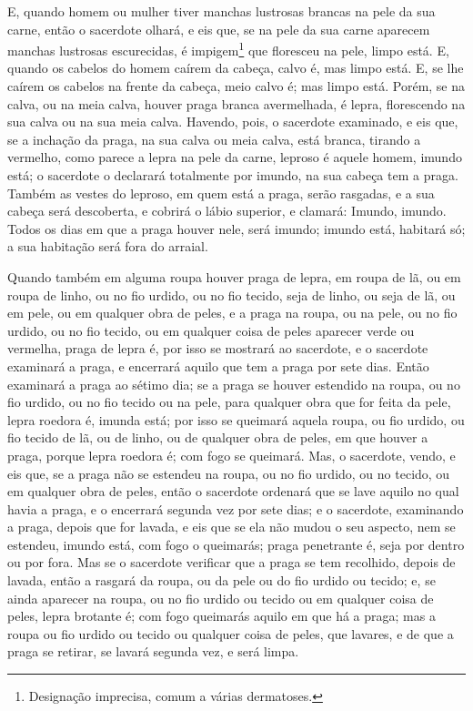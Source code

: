 E, quando homem ou mulher tiver manchas lustrosas brancas na pele
da sua carne, então o sacerdote olhará, e eis que, se na pele
da sua carne aparecem manchas lustrosas escurecidas, é
impigem\footnote{Designação imprecisa, comum a várias dermatoses.}
que floresceu na pele, limpo está. E, quando os cabelos do
homem caírem da cabeça, calvo é, mas limpo está. E, se lhe
caírem os cabelos na frente da cabeça, meio calvo é; mas limpo está.
Porém, se na calva, ou na meia calva, houver praga branca
avermelhada, é lepra, florescendo na sua calva ou na sua meia calva.
Havendo, pois, o sacerdote examinado, e eis que, se a
inchação da praga, na sua calva ou meia calva, está branca, tirando
a vermelho, como parece a lepra na pele da carne, leproso é
aquele homem, imundo está; o sacerdote o declarará totalmente por
imundo, na sua cabeça tem a praga. Também as vestes do
leproso, em quem está a praga, serão rasgadas, e a sua cabeça será
descoberta, e cobrirá o lábio superior, e clamará: Imundo, imundo.
Todos os dias em que a praga houver nele, será imundo; imundo
está, habitará só; a sua habitação será fora do arraial.

Quando também em alguma roupa houver praga de lepra, em roupa de
lã, ou em roupa de linho, ou no fio urdido, ou no fio tecido,
seja de linho, ou seja de lã, ou em pele, ou em qualquer obra de
peles, e a praga na roupa, ou na pele, ou no fio urdido, ou
no fio tecido, ou em qualquer coisa de peles aparecer verde ou
vermelha, praga de lepra é, por isso se mostrará ao sacerdote,
e o sacerdote examinará a praga, e encerrará aquilo que tem a
praga por sete dias. Então examinará a praga ao sétimo dia;
se a praga se houver estendido na roupa, ou no fio urdido, ou no fio
tecido ou na pele, para qualquer obra que for feita da pele, lepra
roedora é, imunda está; por isso se queimará aquela roupa, ou
fio urdido, ou fio tecido de lã, ou de linho, ou de qualquer obra de
peles, em que houver a praga, porque lepra roedora é; com fogo se
queimará. Mas, o sacerdote, vendo, e eis que, se a praga não
se estendeu na roupa, ou no fio urdido, ou no tecido, ou em qualquer
obra de peles, então o sacerdote ordenará que se lave aquilo
no qual havia a praga, e o encerrará segunda vez por sete dias;
e o sacerdote, examinando a praga, depois que for lavada, e
eis que se ela não mudou o seu aspecto, nem se estendeu, imundo
está, com fogo o queimarás; praga penetrante é, seja por dentro ou
por fora. Mas se o sacerdote verificar que a praga se tem
recolhido, depois de lavada, então a rasgará da roupa, ou da pele ou
do fio urdido ou tecido; e, se ainda aparecer na roupa, ou no
fio urdido ou tecido ou em qualquer coisa de peles, lepra brotante
é; com fogo queimarás aquilo em que há a praga; mas a roupa
ou fio urdido ou tecido ou qualquer coisa de peles, que lavares, e
de que a praga se retirar, se lavará segunda vez, e será limpa.

